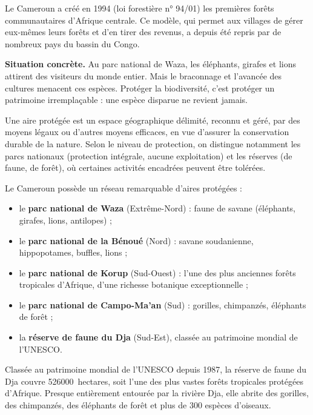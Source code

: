 \documentclass[11pt]{article}
\newcommand{\cle}[1]{{\popxbold\color{popdark}#1}}
\newcounter{popsec}
\newcounter{popsub}
\newcommand{\courssub}[1]{%
  \stepcounter{popsub}%
  \par\vspace{9pt}\noindent{\popxbold\fontsize{11.5}{13}\selectfont\color{popink}{\color{poporange}\thepopsec.\thepopsub}\hspace{6pt}#1}\par\nopagebreak\vspace{4pt}
}
\begin{document}
\begin{savaistu}
Le Cameroun a créé en 1994 (loi forestière n° 94/01) les premières \cle{forêts communautaires} d'Afrique centrale. Ce modèle, qui permet aux villages de gérer eux-mêmes leurs forêts et d'en tirer des revenus, a depuis été repris par de nombreux pays du bassin du Congo.
\end{savaistu}

\courssub{La conservation de la biodiversité}

\textbf{Situation concrète.} Au parc national de Waza, les éléphants, girafes et lions attirent des visiteurs du monde entier. Mais le braconnage et l'avancée des cultures menacent ces espèces. Protéger la biodiversité, c'est protéger un patrimoine irremplaçable : une espèce disparue ne revient jamais.

\begin{definition}
Une \cle{aire protégée} est un espace géographique délimité, reconnu et géré, par des moyens légaux ou d'autres moyens efficaces, en vue d'assurer la conservation durable de la nature. Selon le niveau de protection, on distingue notamment les \cle{parcs nationaux} (protection intégrale, aucune exploitation) et les \cle{réserves} (de faune, de forêt), où certaines activités encadrées peuvent être tolérées.
\end{definition}

Le Cameroun possède un réseau remarquable d'aires protégées :

\begin{itemize}
\item le \textbf{parc national de Waza} (Extrême-Nord) : faune de savane (éléphants, girafes, lions, antilopes) ;
\item le \textbf{parc national de la Bénoué} (Nord) : savane soudanienne, hippopotames, buffles, lions ;
\item le \textbf{parc national de Korup} (Sud-Ouest) : l'une des plus anciennes forêts tropicales d'Afrique, d'une richesse botanique exceptionnelle ;
\item le \textbf{parc national de Campo-Ma'an} (Sud) : gorilles, chimpanzés, éléphants de forêt ;
\item la \textbf{réserve de faune du Dja} (Sud-Est), classée au patrimoine mondial de l'UNESCO.
\end{itemize}

\begin{exemplebox}
Classée au patrimoine mondial de l'UNESCO depuis 1987, la réserve de faune du \cle{Dja} couvre \SI{526000}{hectares}, soit l'une des plus vastes forêts tropicales protégées d'Afrique. Presque entièrement entourée par la rivière Dja, elle abrite des gorilles, des chimpanzés, des éléphants de forêt et plus de 300 espèces d'oiseaux.
\end{exemplebox}
\end{document}
